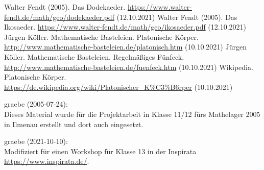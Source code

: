 \documentclass[11pt]{article}
\begin{document}
\begin{thebibliography}{xxx}
 Walter Fendt (2005). Das Dodekaeder.
  \url{https://www.walter-fendt.de/math/geo/dodekaeder.pdf} (12.10.2021) 
 Walter Fendt (2005). Das Ikosaeder.
  \url{https://www.walter-fendt.de/math/geo/ikosaeder.pdf} (12.10.2021) 
 Jürgen Köller. Mathematische Basteleien.
  Platonische Körper.\\
  \url{http://www.mathematische-basteleien.de/platonisch.htm} (10.10.2021)
 Jürgen Köller. Mathematische Basteleien.
  Regelmäßiges Fünfeck.\\
  \url{http://www.mathematische-basteleien.de/fuenfeck.htm} (10.10.2021)
 Wikipedia. Platonische Körper.\\ 
  \url{https://de.wikipedia.org/wiki/Platonischer_K%C3%B6rper} (10.10.2021)
\end{thebibliography}

\begin{attribution}
graebe (2005-07-24):\\ Dieses Material wurde für die Projektarbeit in Klasse
11/12 fürs Mathelager 2005 in Ilmenau erstellt und dort auch eingesetzt.

graebe (2021-10-10):\\ Modifiziert für einen Workshop für Klasse 13 in der
Inspirata \url{https://www.inspirata.de/}.

\end{attribution}
\end{document}
